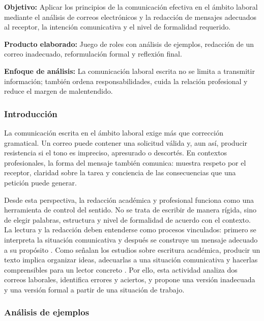 \begin{portafolioabstract}
	\textbf{Objetivo:} Aplicar los principios de la comunicación efectiva en el ámbito laboral mediante el análisis de correos electrónicos y la redacción de mensajes adecuados al receptor, la intención comunicativa y el nivel de formalidad requerido.

	\textbf{Producto elaborado:} Juego de roles con análisis de ejemplos, redacción de un correo inadecuado, reformulación formal y reflexión final.

	\textbf{Enfoque de análisis:} La comunicación laboral escrita no se limita a transmitir información; también ordena responsabilidades, cuida la relación profesional y reduce el margen de malentendido.
\end{portafolioabstract}

\subsubsection{Introducción}

La comunicación escrita en el ámbito laboral exige más que corrección gramatical. Un correo puede contener una solicitud válida y, aun así, producir resistencia si el tono es impreciso, apresurado o descortés. En contextos profesionales, la forma del mensaje también comunica: muestra respeto por el receptor, claridad sobre la tarea y conciencia de las consecuencias que una petición puede generar.

Desde esta perspectiva, la redacción académica y profesional funciona como una herramienta de control del sentido. No se trata de escribir de manera rígida, sino de elegir palabras, estructura y nivel de formalidad de acuerdo con el contexto. La lectura y la redacción deben entenderse como procesos vinculados: primero se interpreta la situación comunicativa y después se construye un mensaje adecuado a su propósito \citep{ayalaTallerLecturaRedaccion2010}. Como señalan los estudios sobre escritura académica, producir un texto implica organizar ideas, adecuarlas a una situación comunicativa y hacerlas comprensibles para un lector concreto \citep{nunezcortesEscrituraAcademicaTeoria2015,vitoriaEscrituraAcademicaFormacion2019}. Por ello, esta actividad analiza dos correos laborales, identifica errores y aciertos, y propone una versión inadecuada y una versión formal a partir de una situación de trabajo.

\subsubsection{Análisis de ejemplos}

